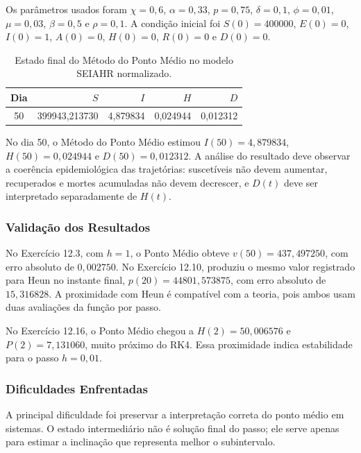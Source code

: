 Os parâmetros usados foram \(\chi=0{,}6\), \(\alpha=0{,}33\), \(p=0{,}75\), \(\delta=0{,}1\), \(\phi=0{,}01\), \(\mu=0{,}03\), \(\beta=0{,}5\) e \(\rho=0{,}1\). A condição inicial foi \(S(0)=400000\), \(E(0)=0\), \(I(0)=1\), \(A(0)=0\), \(H(0)=0\), \(R(0)=0\) e \(D(0)=0\).

\begin{table}[H]
    \centering
    \caption{Estado final do Método do Ponto Médio no modelo SEIAHR normalizado.}
    \begin{tabular}{c|r|r|r|r}
        \textbf{Dia} & \textbf{\(S\)} & \textbf{\(I\)} & \textbf{\(H\)} & \textbf{\(D\)} \\
        \hline
        50 & 399943{,}213730 & 4{,}879834 & 0{,}024944 & 0{,}012312 \\
    \end{tabular}
\end{table}

No dia 50, o Método do Ponto Médio estimou \(I(50)=4{,}879834\), \(H(50)=0{,}024944\) e \(D(50)=0{,}012312\). A análise do resultado deve observar a coerência epidemiológica das trajetórias: suscetíveis não devem aumentar, recuperados e mortes acumuladas não devem decrescer, e \(D(t)\) deve ser interpretado separadamente de \(H(t)\).

\subsubsection{Validação dos Resultados}

No Exercício 12.3, com \(h=1\), o Ponto Médio obteve \(v(50)=437{,}497250\), com erro absoluto de \(0{,}002750\). No Exercício 12.10, produziu o mesmo valor registrado para Heun no instante final, \(p(20)=44801{,}573875\), com erro absoluto de \(15{,}316828\). A proximidade com Heun é compatível com a teoria, pois ambos usam duas avaliações da função por passo.

No Exercício 12.16, o Ponto Médio chegou a \(H(2)=50{,}006576\) e \(P(2)=7{,}131060\), muito próximo do RK4. Essa proximidade indica estabilidade para o passo \(h=0{,}01\).

\subsubsection{Dificuldades Enfrentadas}

A principal dificuldade foi preservar a interpretação correta do ponto médio em sistemas. O estado intermediário não é solução final do passo; ele serve apenas para estimar a inclinação que representa melhor o subintervalo.

